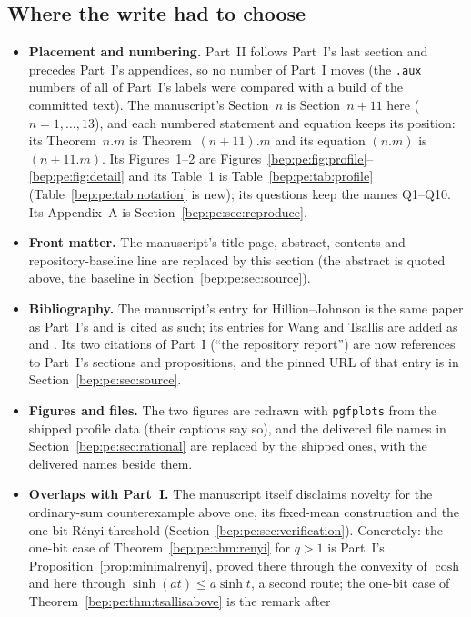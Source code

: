 \documentclass[11pt]{article}
\numberwithin{equation}{section}
\theoremstyle{definition}
\theoremstyle{remark}
\begin{document}
\subsection{Where the write had to choose}\label{bep:pe:sec:choices}
\begin{itemize}
\item \textbf{Placement and numbering.} Part~II follows Part~I's last
section and precedes Part~I's appendices, so no number of Part~I moves (the
\texttt{.aux} numbers of all of Part~I's labels were compared with a build
of the committed text). The manuscript's Section~$n$ is
Section~$n+11$ here ($n=1,\ldots,13$), and each numbered statement and
equation keeps its position: its Theorem~$n.m$ is Theorem~$(n+11).m$ and
its equation $(n.m)$ is $(n+11.m)$. Its Figures~1--2 are
Figures~\ref{bep:pe:fig:profile}--\ref{bep:pe:fig:detail} and its Table~1
is Table~\ref{bep:pe:tab:profile} (Table~\ref{bep:pe:tab:notation} is new); its
questions keep the names Q1--Q10.
Its Appendix~A is Section~\ref{bep:pe:sec:reproduce}.
\item \textbf{Front matter.} The manuscript's title page, abstract,
contents and repository-baseline line are replaced by this section (the
abstract is quoted above, the baseline in
Section~\ref{bep:pe:sec:source}).
\item \textbf{Bibliography.} The manuscript's entry for Hillion--Johnson
is the same paper as Part~I's \cite{HJ2017} and is cited as such; its
entries for Wang and Tsallis are added as \cite{bep:pe:Wang} and
\cite{bep:pe:Tsallis}. Its two citations of Part~I (``the repository
report'') are now references to Part~I's sections and propositions, and
the pinned URL of that entry is in Section~\ref{bep:pe:sec:source}.
\item \textbf{Figures and files.} The two figures are redrawn with
\texttt{pgfplots} from the shipped profile data (their captions say so),
and the delivered file names in Section~\ref{bep:pe:sec:rational} are
replaced by the shipped ones, with the delivered names beside them.
\item \textbf{Overlaps with Part~I.} The manuscript itself disclaims
novelty for the ordinary-sum counterexample above one, its fixed-mean
construction and the one-bit R\'enyi threshold
(Section~\ref{bep:pe:sec:verification}). Concretely: the one-bit case of
Theorem~\ref{bep:pe:thm:renyi} for $q>1$ is Part~I's
Proposition~\ref{prop:minimalrenyi}, proved there through the convexity of
$\cosh$ and here through $\sinh(at)\leq a\sinh t$, a second route; the
one-bit case of Theorem~\ref{bep:pe:thm:tsallisabove} is the remark after

\end{itemize}
\end{document}
